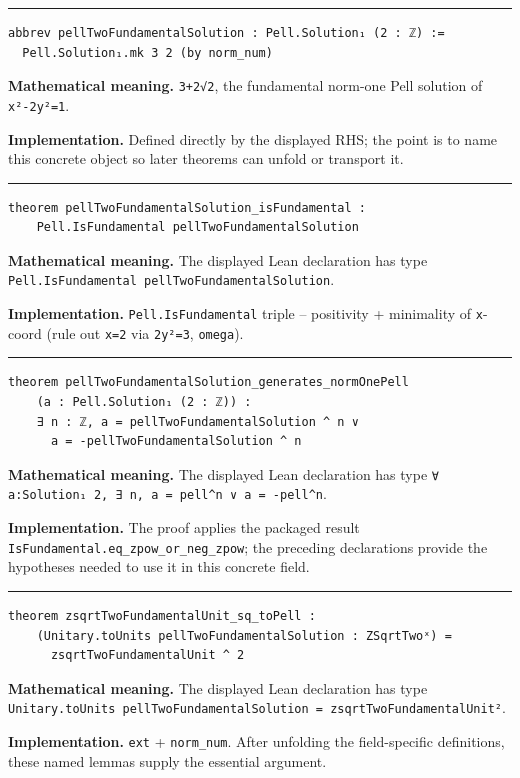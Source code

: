 \documentclass[UTF8,a4paper,11pt,fontset=fandol]{ctexart}
\theoremstyle{definition}
\newcommand{\statementsep}{\par\medskip\hrule\medskip}
\begin{document}
\statementsep
\begin{verbatim}
abbrev pellTwoFundamentalSolution : Pell.Solution₁ (2 : ℤ) :=
  Pell.Solution₁.mk 3 2 (by norm_num)
\end{verbatim}
\noindent\textbf{Mathematical meaning.} \texttt{3+2√2}, the fundamental norm-one Pell solution of \texttt{x²-2y²=1}.\par
\noindent\textbf{Implementation.} Defined directly by the displayed RHS; the point is to name this concrete object so later theorems can unfold or transport it.\par
\statementsep
\begin{verbatim}
theorem pellTwoFundamentalSolution_isFundamental :
    Pell.IsFundamental pellTwoFundamentalSolution
\end{verbatim}
\noindent\textbf{Mathematical meaning.} The displayed Lean declaration has type \texttt{Pell.\allowbreak{}IsFundamental pellTwoFundamentalSolution}.\par
\noindent\textbf{Implementation.} \texttt{Pell.\allowbreak{}IsFundamental} triple -- positivity + minimality of \texttt{x}-coord (rule out \texttt{x=2} via \texttt{2y²=3}, \texttt{omega}).\par
\statementsep
\begin{verbatim}
theorem pellTwoFundamentalSolution_generates_normOnePell
    (a : Pell.Solution₁ (2 : ℤ)) :
    ∃ n : ℤ, a = pellTwoFundamentalSolution ^ n ∨
      a = -pellTwoFundamentalSolution ^ n
\end{verbatim}
\noindent\textbf{Mathematical meaning.} The displayed Lean declaration has type \texttt{∀ a:Solution₁ 2, ∃ n, a = pell\textasciicircum{}n ∨ a = -pell\textasciicircum{}n}.\par
\noindent\textbf{Implementation.} The proof applies the packaged result \texttt{IsFundamental.\allowbreak{}eq\_\allowbreak{}zpow\_\allowbreak{}or\_\allowbreak{}neg\_\allowbreak{}zpow}; the preceding declarations provide the hypotheses needed to use it in this concrete field.\par
\statementsep
\begin{verbatim}
theorem zsqrtTwoFundamentalUnit_sq_toPell :
    (Unitary.toUnits pellTwoFundamentalSolution : ZSqrtTwoˣ) =
      zsqrtTwoFundamentalUnit ^ 2
\end{verbatim}
\noindent\textbf{Mathematical meaning.} The displayed Lean declaration has type \texttt{Unitary.\allowbreak{}toUnits pellTwoFundamentalSolution = zsqrtTwoFundamentalUnit²}.\par
\noindent\textbf{Implementation.} \texttt{ext} + \texttt{norm\_\allowbreak{}num}. After unfolding the field-specific definitions, these named lemmas supply the essential argument.\par
\end{document}
